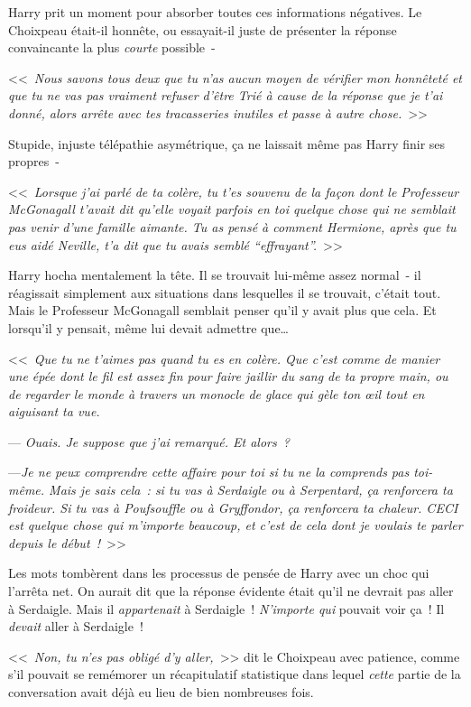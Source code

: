 Harry prit un moment pour absorber toutes ces informations négatives. Le Choixpeau était-il honnête, ou essayait-il juste de présenter la réponse convaincante la plus \emph{courte} possible~-

<<~\emph{Nous savons tous deux que tu n'as aucun moyen de vérifier mon honnêteté et que tu ne vas pas vraiment refuser d'être Trié à cause de la réponse que je t'ai donné, alors arrête avec tes tracasseries inutiles et passe à autre chose.}~>>

Stupide, injuste télépathie asymétrique, ça ne laissait même pas Harry finir ses propres~-

<<~\emph{Lorsque j'ai parlé de ta colère, tu t'es souvenu de la façon dont le Professeur McGonagall t'avait dit qu'elle voyait parfois en toi quelque chose qui ne semblait pas venir d'une famille aimante. Tu as pensé à comment Hermione, après que tu eus aidé Neville, t'a dit que tu avais semblé “effrayant”.}~>>

Harry hocha mentalement la tête. Il se trouvait lui-même assez normal~- il réagissait simplement aux situations dans lesquelles il se trouvait, c'était tout. Mais le Professeur McGonagall semblait penser qu'il y avait plus que cela. Et lorsqu'il y pensait, même lui devait admettre que…

<<~\emph{Que tu ne t'aimes pas quand tu es en colère. Que c'est comme de manier une épée dont le fil est assez fin pour faire jaillir du sang de ta propre main, ou de regarder le monde à travers un monocle de glace qui gèle ton œil tout en aiguisant ta vue.}

--- \emph{Ouais. Je suppose que j'ai remarqué. Et alors~?}

---\emph{Je ne peux comprendre cette affaire pour toi si tu ne la comprends pas toi-même. Mais je sais cela~: si tu vas à Serdaigle ou à Serpentard, ça renforcera ta froideur. Si tu vas à Poufsouffle ou à Gryffondor, ça renforcera ta chaleur. CECI est quelque chose qui m'importe beaucoup, et c'est de cela dont je voulais te parler depuis le début~!}~>>

Les mots tombèrent dans les processus de pensée de Harry avec un choc qui l'arrêta net. On aurait dit que la réponse évidente était qu'il ne devrait pas aller à Serdaigle. Mais il \emph{appartenait} à Serdaigle~! \emph{N'importe qui} pouvait voir ça~! Il \emph{devait} aller à Serdaigle~!

<<~\emph{Non, tu n'es pas obligé d'y aller,}~>> dit le Choixpeau avec patience, comme s'il pouvait se remémorer un récapitulatif statistique dans lequel \emph{cette} partie de la conversation avait déjà eu lieu de bien nombreuses fois.

